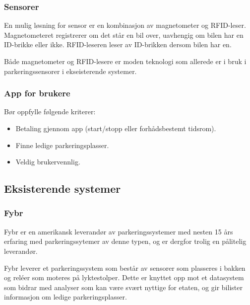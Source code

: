 \documentclass[a4paper, norsk, 12pt]{article}
\theoremstyle{remark}
\begin{document}
\subsubsection{Sensorer}
\label{ssub:sensorer}
En mulig løsning for sensor er en kombinasjon av magnetometer og RFID-leser. Magnetometeret registrerer om det står en bil over, uavhengig om bilen har en ID-brikke eller ikke. RFID-leseren leser av ID-brikken dersom bilen har en.

Både magnetometer og RFID-lesere er moden teknologi som allerede er i bruk i parkeringssensorer i ekseisterende systemer. 

\subsubsection{App for brukere}
\label{ssub:app_for_brukere}
Bør oppfylle følgende kriterer:
\begin{itemize}
	\item Betaling gjennom app (start/stopp eller forhådsbestemt tidsrom).
	\item Finne ledige parkeringsplasser.
	\item Veldig brukervennlig.
\end{itemize}




\subsection{Eksisterende systemer}
\label{sub:sksisterende_systemer}


\clearpage
\subsubsection{Fybr}
\label{ssub:fybr}
Fybr er en amerikansk leverandør av parkeringssystemer med nesten 15 års erfaring med parkeringssytemer av denne typen, og er dergfor trolig en pålitelig leverandør.

Fybr leverer et parkeringssystem som består av sensorer som plasseres i bakken og reléer som moteres på lyktestolper. Dette er knyttet opp mot et datasystem som bidrar med analyser som kan være svært nyttige for etaten, og gir bilister informasjon om ledige parkeringsplasser. 
\end{document}
